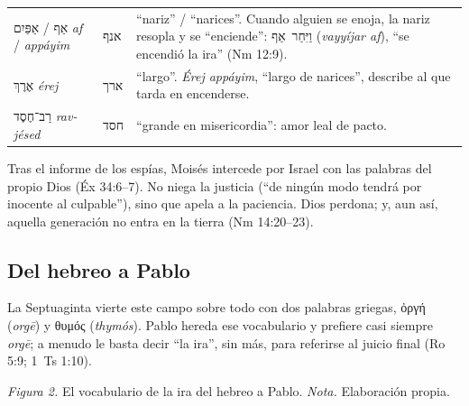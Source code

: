 \documentclass[11pt,letterpaper]{article}
\newcommand{\heb}[1]{\mbox{\foreignlanguage{hebrew}{#1}}}
\newcommand{\grc}[1]{\foreignlanguage{ancientgreek}{#1}}
\begin{document}
\begin{filologia}[Nm 14:18]
\begin{tabular}{@{}L{3.2cm}L{1.6cm}L{10cm}@{}}
\heb{אַף} / \heb{אַפַּיִם} \emph{af} / \emph{appáyim} & \heb{אנף} & ``nariz'' / ``narices''. Cuando alguien se enoja, la nariz resopla y se ``enciende'': \heb{וַיִּחַר אַף} (\emph{vayyíjar af}), ``se encendió la ira'' (Nm 12:9). \\[2pt]
\heb{אֶרֶךְ} \emph{érej} & \heb{ארך} & ``largo''. \emph{Érej appáyim}, ``largo de narices'', describe al que tarda en encenderse. \\[2pt]
\heb{רַב־חֶסֶד} \emph{rav-jésed} & \heb{חסד} & ``grande en misericordia'': amor leal de pacto. \\
\end{tabular}
\end{filologia}

Tras el informe de los espías, Moisés intercede por Israel con las palabras del propio Dios (Éx 34:6--7). No niega la justicia (``de ningún modo tendrá por inocente al culpable''), sino que apela a la paciencia. Dios perdona; y, aun así, aquella generación no entra en la tierra (Nm 14:20--23).

\subsection{Del hebreo a Pablo}
La Septuaginta vierte este campo sobre todo con dos palabras griegas, \grc{ὀργή} (\emph{orgē}) y \grc{θυμός} (\emph{thymós}). Pablo hereda ese vocabulario y prefiere casi siempre \emph{orgē}; a menudo le basta decir ``la ira'', sin más, para referirse al juicio final (Ro 5:9; 1~Ts 1:10).

\begin{center}
\par
{\footnotesize\color{gris}\textit{Figura 2.} El vocabulario de la ira del hebreo a Pablo. \textit{Nota.} Elaboración propia.}
\end{center}
\end{document}
